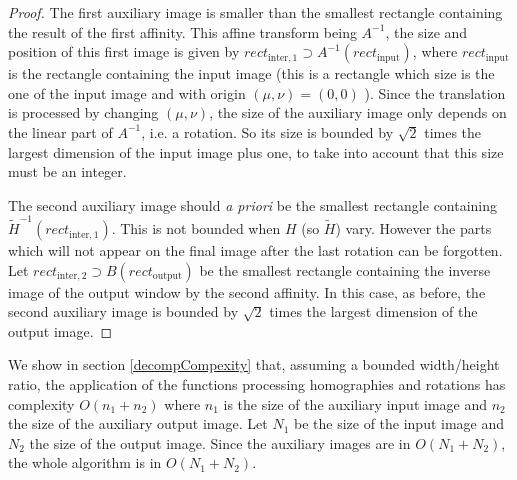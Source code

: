   \begin{proof}
  The first auxiliary image is smaller than the smallest rectangle containing the result of the first affinity. This affine transform being $A^{-1}$, the size and position of this first image is given by $rect_{\text{inter},1} \supset A^{-1}(rect_\text{input})$, where $rect_\text{input}$ is the rectangle containing the input image (this is a rectangle which size is the one of the input image and with origin $(\mu,\nu)=(0,0)$ ). Since the translation is processed by changing $(\mu,\nu)$, the size of the auxiliary image only depends on the linear part of $A^{-1}$, i.e. a rotation. So its size is bounded by $\sqrt{2}$ times the largest dimension of the input image plus one, to take into account that this size must be an integer.
  
  The second auxiliary image should \emph{a priori} be the smallest rectangle containing $\tilde H^{-1}(rect_{\text{inter},1})$. This is not bounded when $H$ (so $\tilde H$) vary. However the parts which will not appear on the final image after the last rotation can be forgotten. Let $rect_{\text{inter},2} \supset B(rect_{\text{output}})$ be the smallest rectangle containing the inverse image of the output window by the second affinity. In this case, as before, the second auxiliary image is bounded by $\sqrt{2}$ times the largest dimension of the output image.
   \end{proof}
 
 We show in section \ref{decompCompexity} that, assuming a bounded width/height ratio, the application of the functions processing homographies and rotations has complexity $O(n_1+n_2)$ where $n_1$ is the size of the auxiliary input image and $n_2$ the size of the auxiliary output image. Let $N_1$ be the size of the input image and $N_2$ the size of the output image. Since the auxiliary images are in $O(N_1+N_2)$, the whole algorithm is in $O(N_1+N_2)$.
 
 
